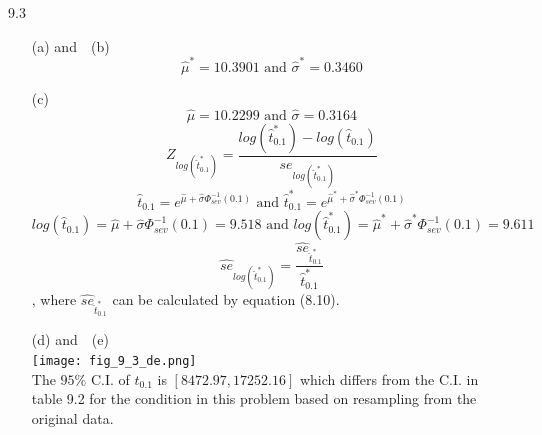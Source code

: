 \documentclass[paper=a4, fontsize=12pt]{scrartcl} %
\numberwithin{equation}{section} %
\numberwithin{figure}{section} %
\numberwithin{table}{section} %
\begin{document}
9.3 	
\begin{itemize}
	\item[(a)]	and\ \  (b) $$\widehat{\mu}^* = 10.3901 \text{\ \ and\ \ } \widehat{\sigma}^* = 0.3460$$
	\item[(c)]	$$\widehat{\mu} = 10.2299 \text{\ \ and\ \ } \widehat{\sigma} = 0.3164$$ 
			$$Z_{log\left( \widehat{t}_{0.1}^* \right)} = \frac{log\left( \widehat{t}_{0.1}^* \right) - log\left( \widehat{t}_{0.1} \right)}{\widehat{se}_{log\left( \widehat{t}_{0.1}^* \right)}}$$
			$$\widehat{t}_{0.1} = e^{\widehat{\mu} + \widehat{\sigma}\Phi_{sev}^{-1}(0.1)} \text{\ \ and \ \ } \widehat{t}_{0.1}^* = e^{\widehat{\mu}^* + \widehat{\sigma}^*\Phi_{sev}^{-1}(0.1)}$$
			$$log\left( \widehat{t}_{0.1} \right) = \widehat{\mu} + \widehat{\sigma}\Phi_{sev}^{-1}(0.1)=9.518 \text{\ \ and\ \ }log\left( \widehat{t}_{0.1}^* \right) = \widehat{\mu}^* + \widehat{\sigma}^*\Phi_{sev}^{-1}(0.1)=9.611 $$
			$$\widehat{se}_{log\left( \widehat{t}_{0.1}^* \right)} = \frac{\widehat{se}_{ \widehat{t}_{0.1}^* }}{\widehat{t}_{0.1}^* }$$
			, where $\widehat{se}_{ \widehat{t}_{0.1}^* }$ can be calculated by equation (8.10).
	\item[(d)]	and\ \  (e)\ \\
			\texttt{[image: fig\_9\_3\_de.png]}\\
			The $95\%$ C.I. of $t_{0.1}$ is $[8472.97, 17252.16]$ which differs from the C.I. in table 9.2 for the condition in this problem based on resampling from the original data.
\end{itemize}

\end{document}
